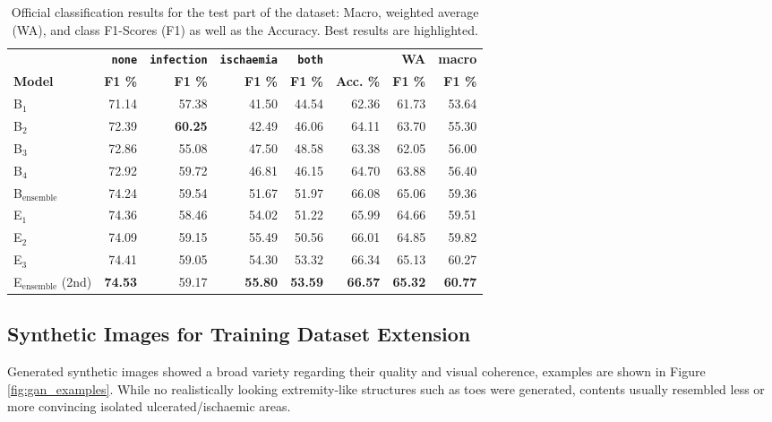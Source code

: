 \documentclass[runningheads]{llncs}
\begin{document}
\begin{table}[ht!]
	\begin{center}
		\caption{Official classification results for the test part of the dataset: Macro, weighted average (WA), and class F1-Scores (F1) as well as the Accuracy. Best results are highlighted.}\label{tab:Results}
		\begin{tabularx}{\textwidth}{|X|r|r|r|r|r|r|r|}
			\hline
			\textbf{}& \textbf{\texttt{none}} & \textbf{\texttt{infection}} & \textbf{\texttt{ischaemia}} & \textbf{\texttt{both}}&\textbf{}&\textbf{WA}&\textbf{macro} \\
			\textbf{Model}& \textbf{F1 \%} & \textbf{F1 \%} & \textbf{F1 \%} & \textbf{F1 \%} & \textbf{Acc. \%} &\textbf{F1 \%} & \textbf{F1 \%}\\
			\hline\hline
			B$_1$&71.14&57.38&41.50&44.54&62.36&61.73&53.64\\
			B$_2$&72.39&\textbf{60.25}&42.49&46.06&64.11&63.70&55.30\\
			B$_3$ &72.86&55.08&47.50&48.58&63.38&62.05&56.00\\
			B$_4$ &	72.92&59.72&46.81&46.15&64.70&63.88&56.40\\\hline
			B$_\text{ensemble}$ & 74.24&59.54&51.67&51.97&66.08&65.06&59.36\\\hline\hline
			E$_1$ & 74.36&58.46&54.02&51.22&65.99&64.66&59.51\\
			E$_2$ & 74.09&59.15&55.49&50.56&66.01&64.85&59.82\\
			E$_3$ & 74.41&59.05&54.30&53.32&66.34&65.13&60.27\\\hline
			E$_\text{ensemble}$ (2nd) &\textbf{74.53}&59.17&\textbf{55.80}&\textbf{53.59}&\textbf{66.57}&\textbf{65.32}&\textbf{60.77}\\
			\hline
		\end{tabularx}		
	\end{center}
\end{table}



\subsection{Synthetic Images for Training Dataset Extension} %

Generated synthetic images showed a broad variety regarding their quality and visual coherence, examples are shown in Figure \ref{fig:gan_examples}. While no realistically looking extremity-like structures such as toes were generated, contents usually resembled less or more convincing isolated ulcerated/ischaemic areas.
\end{document}
